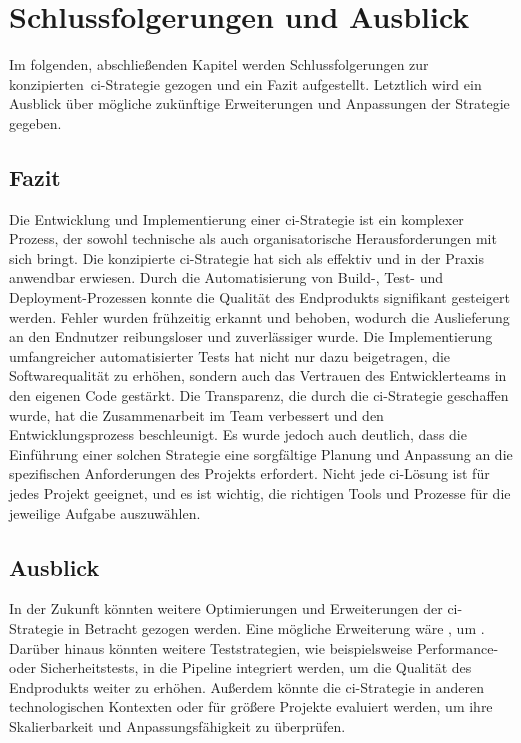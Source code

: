 
\section{Schlussfolgerungen und Ausblick} \label{sec:06-prospect}


Im folgenden, abschließenden Kapitel werden Schlussfolgerungen zur konzipierten\ \acrshort{ci}-Strategie gezogen
und ein Fazit aufgestellt.
Letztlich wird ein Ausblick über mögliche zukünftige Erweiterungen und Anpassungen der Strategie gegeben.

\subsection{Fazit} \label{subsec:06-prospect-1}


Die Entwicklung und Implementierung einer \acrshort{ci}-Strategie ist ein komplexer Prozess, der sowohl technische als
auch organisatorische Herausforderungen mit sich bringt.
Die konzipierte \acrshort{ci}-Strategie hat sich als effektiv und in der Praxis anwendbar erwiesen.
Durch die Automatisierung von Build-, Test- und Deployment-Prozessen konnte die Qualität des Endprodukts signifikant
gesteigert werden.
Fehler wurden frühzeitig erkannt und behoben, wodurch die Auslieferung an den Endnutzer reibungsloser und zuverlässiger
wurde.
Die Implementierung umfangreicher automatisierter Tests hat nicht nur dazu beigetragen, die Softwarequalität zu erhöhen,
sondern auch das Vertrauen des Entwicklerteams in den eigenen Code gestärkt.
Die Transparenz, die durch die \acrshort{ci}-Strategie geschaffen wurde, hat die Zusammenarbeit im Team verbessert und
den Entwicklungsprozess beschleunigt.
Es wurde jedoch auch deutlich, dass die Einführung einer solchen Strategie eine sorgfältige Planung und Anpassung an die
spezifischen Anforderungen des Projekts erfordert.
Nicht jede \acrshort{ci}-Lösung ist für jedes Projekt geeignet, und es ist wichtig, die richtigen Tools und Prozesse
für die jeweilige Aufgabe auszuwählen.

\subsection{Ausblick} \label{subsec:06-prospect-2}


In der Zukunft könnten weitere Optimierungen und Erweiterungen der \acrshort{ci}-Strategie in Betracht gezogen werden.
Eine mögliche Erweiterung wäre , um .
Darüber hinaus könnten weitere Teststrategien, wie beispielsweise Performance- oder Sicherheitstests, in die
Pipeline integriert werden, um die Qualität des Endprodukts weiter zu erhöhen.
Außerdem könnte die \acrshort{ci}-Strategie in anderen technologischen Kontexten oder für größere Projekte evaluiert
werden, um ihre Skalierbarkeit und Anpassungsfähigkeit zu überprüfen.


\clearpage
